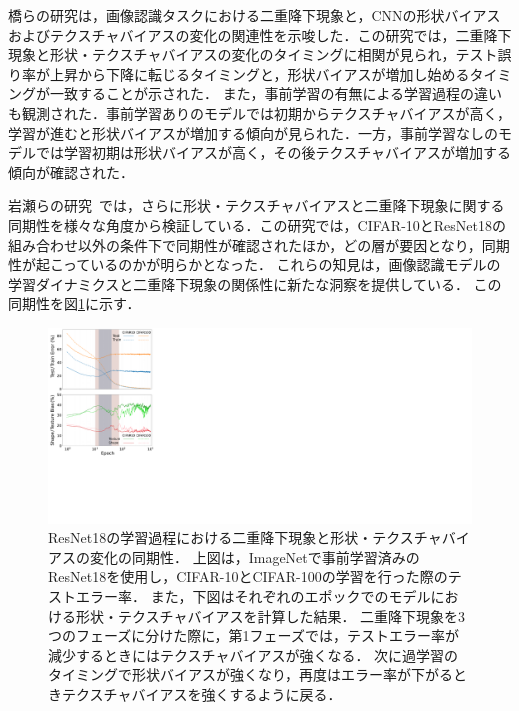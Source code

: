 橋らの研究\cite{DD_STB}は，画像認識タスクにおける二重降下現象と，CNNの形状バイアスおよびテクスチャバイアスの変化の関連性を示唆した．この研究では，二重降下現象と形状・テクスチャバイアスの変化のタイミングに相関が見られ，テスト誤り率が上昇から下降に転じるタイミングと，形状バイアスが増加し始めるタイミングが一致することが示された．
また，事前学習の有無による学習過程の違いも観測された．事前学習ありのモデルでは初期からテクスチャバイアスが高く，学習が進むと形状バイアスが増加する傾向が見られた．一方，事前学習なしのモデルでは学習初期は形状バイアスが高く，その後テクスチャバイアスが増加する傾向が確認された．

岩瀬らの研究~\cite{icpr2024iwase}では，さらに形状・テクスチャバイアスと二重降下現象に関する同期性を様々な角度から検証している．この研究では，CIFAR-10とResNet18の組み合わせ以外の条件下で同期性が確認されたほか，どの層が要因となり，同期性が起こっているのかが明らかとなった．
これらの知見は，画像認識モデルの学習ダイナミクスと二重降下現象の関係性に新たな洞察を提供している．
この同期性を図\ref{fig:iwaseICPR}に示す．

\begin{figure}[H]
    \centering
    \includegraphics[width=\linewidth]{fig/iwaseICPR.pdf}
    \caption[ResNet18の学習過程における二重降下現象と形状・テクスチャバイアスの変化の同期性]{ResNet18の学習過程における二重降下現象と形状・テクスチャバイアスの変化の同期性．
    上図は，ImageNetで事前学習済みのResNet18を使用し，CIFAR-10とCIFAR-100の学習を行った際のテストエラー率．
    また，下図はそれぞれのエポックでのモデルにおける形状・テクスチャバイアスを計算した結果．
    二重降下現象を3つのフェーズに分けた際に，第1フェーズでは，テストエラー率が減少するときにはテクスチャバイアスが強くなる．
    次に過学習のタイミングで形状バイアスが強くなり，再度はエラー率が下がるときテクスチャバイアスを強くするように戻る．}
    \label{fig:iwaseICPR}
\end{figure}

